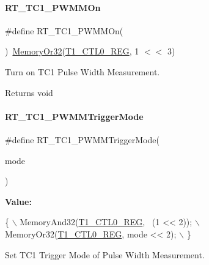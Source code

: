 \paragraph{\texorpdfstring{R\+T\+\_\+\+T\+C1\+\_\+\+P\+W\+M\+M\+On}{RT\_TC1\_PWMMOn}}
{\footnotesize\ttfamily \#define R\+T\+\_\+\+T\+C1\+\_\+\+P\+W\+M\+M\+On(\begin{DoxyParamCaption}{ }\end{DoxyParamCaption})~\mbox{\hyperlink{a00020_a27874a97deab7cecdde5ddecf466e31e}{Memory\+Or32}}(\mbox{\hyperlink{a00020_adadaa0ab1ebbd7ba9b70dfd24c3ed44da38632250c2e72df96fcaa3f8bd8ecc5e}{T1\+\_\+\+C\+T\+L0\+\_\+\+R\+EG}}, 1 $<$$<$ 3)}



Turn on T\+C1 Pulse Width Measurement. 

\begin{DoxyReturn}{Returns}
void 
\end{DoxyReturn}
\mbox{\label{a00044_a326645a1e9eb49468e696ba7a186cdba}} 
\paragraph{\texorpdfstring{R\+T\+\_\+\+T\+C1\+\_\+\+P\+W\+M\+M\+Trigger\+Mode}{RT\_TC1\_PWMMTriggerMode}}
{\footnotesize\ttfamily \#define R\+T\+\_\+\+T\+C1\+\_\+\+P\+W\+M\+M\+Trigger\+Mode(\begin{DoxyParamCaption}\item[{}]{mode }\end{DoxyParamCaption})}

{\bfseries Value\+:}
\begin{DoxyCode}
\{                                        \(\backslash\)
        MemoryAnd32(\mbox{\hyperlink{a00020_adadaa0ab1ebbd7ba9b70dfd24c3ed44da38632250c2e72df96fcaa3f8bd8ecc5e}{T1\_CTL0\_REG}}, ~(1 << 2)); \(\backslash\)
        MemoryOr32(\mbox{\hyperlink{a00020_adadaa0ab1ebbd7ba9b70dfd24c3ed44da38632250c2e72df96fcaa3f8bd8ecc5e}{T1\_CTL0\_REG}}, mode << 2);  \(\backslash\)
    \}
\end{DoxyCode}


Set T\+C1 Trigger Mode of Pulse Width Measurement. 


